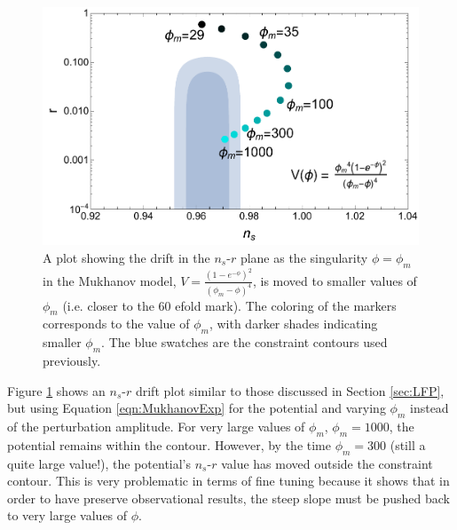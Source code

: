 \documentclass[a4paper,11pt]{article}
\def\nsr{$n_s$-$r$ }
\begin{document}
\begin{figure}[h!]
	\centering
	\includegraphics[width=\textwidth]{figures/Mukhanov.pdf}
	\caption[Drift in \nsr plane for Mukhanov model as the singularity moves to smaller $\phi$.]{A plot showing the drift in the \nsr plane as the singularity $\phi=\phi_m$ in the Mukhanov model, $V=\tfrac{(1-e^{-\phi})^2}{(\phi_m-\phi)^4}$, is moved to smaller values of $\phi_m$ (i.e. closer to the 60 efold mark). The coloring of the markers corresponds to the value of $\phi_m$, with darker shades indicating smaller $\phi_m$. The blue swatches are the \citet{Planck2015} constraint contours used previously.}
	\label{fig:Mukhanov_drift}
\end{figure}

Figure \ref{fig:Mukhanov_drift} shows an \nsr drift plot similar to those discussed in Section \ref{sec:LFP}, but using Equation \ref{eqn:MukhanovExp} for the potential and varying $\phi_m$ instead of the perturbation amplitude. For very large values of $\phi_m$, $\phi_m=1000$, the potential remains within the \citet{Planck2015} contour. However, by the time $\phi_m=300$ (still a quite large value!), the potential's \nsr value has moved outside the constraint contour. This is very problematic in terms of fine tuning because it shows that in order to have preserve observational results, the steep slope must be pushed back to very large values of $\phi$. 
\end{document}
